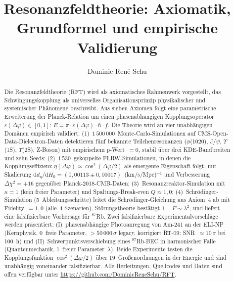 \documentclass[12pt]{iopart}
\begin{document}
	
	\title{Resonanzfeldtheorie: Axiomatik, Grundformel und
		empirische Validierung}
	
	\author{Dominic-Ren\'e Schu}
	\address{Unabh\"angiger Forscher, Deutschland\\
		\href{https://github.com/DominicReneSchu/RFT}%
		{https://github.com/DominicReneSchu/RFT}\\
		ORCID: 0009-0004-9769-9061\\
		Email: dominic.rene.schu@gmail.com}
	
	\begin{abstract}
		Die Resonanzfeldtheorie (RFT) wird als axiomatisches Rahmenwerk
		vorgestellt, das Schwingungskopplung als universelles
		Organisationsprinzip physikalischer und systemischer Ph\"anomene
		beschreibt. Aus sieben Axiomen folgt eine parametrische Erweiterung
		der Planck-Relation um einen phasenabh\"angigen Kopplungsoperator
		$\varepsilon(\Delta\varphi) \in [0,1]$:
		$E = \pi \cdot \varepsilon(\Delta\varphi) \cdot \hbar \cdot f$.
		Die Theorie wird an vier unabh\"angigen Dom\"anen
		empirisch validiert: (1)~$1\,500\,000$~Monte-Carlo-Simulationen
		auf CMS-Open-Data-Dielectron-Daten detektieren f\"unf bekannte
		Teilchenresonanzen ($\phi$(1020), J/$\psi$, $\Upsilon$(1S),
		$\Upsilon$(2S), Z-Boson) mit empirischem p-Wert~$= 0$, stabil
		\"uber drei KDE-Bandbreiten und zehn Seeds;
		(2)~$1\,530$~gekoppelte FLRW-Simulationen, in denen die
		Kopplungseffizienz
		$\eta(\Delta\varphi) \approx \cos^2(\Delta\varphi/2)$ als
		emergente Eigenschaft folgt, mit Skalierung
		$\mathrm{d}d_\eta/\mathrm{d}H_0
		= (0{,}00113 \pm 0{,}00017)$~(km/s/Mpc)$^{-1}$
		und Verbesserung $\Delta\chi^2 = +16$ gegen\"uber
		Planck-2018-CMB-Daten;
		(3)~Resonanzreaktor-Simulation mit $\kappa = 1$ (kein freier
		Parameter) und Spaltungs-Break-even $Q \approx 1{,}0$;
		(4)~Schr\"odinger-Simulation (5~Ableitungsschritte) leitet
		die Schr\"odinger-Gleichung aus Axiom~4 ab mit
		Fidelity~$= 1{,}0$ (alle~4 Szenarien), St\"orungstheorie
		best\"atigt $1-F \sim \lambda^2$, und liefert eine
		falsifizierbare Vorhersage f\"ur ${}^{87}$Rb.
		Zwei falsifizierbare Experimentalvorschl\"age werden
		pr\"asentiert: (I)~phasenabh\"angige Photoanregung von
		Am-241 an der ELI-NP (Kernphysik, 0~freie Parameter,
		$>50\,000\,\sigma$ legacy, korrigiert RT-09: SNR~$\approx 10\,\sigma$ bei 100~h) und (II)~Schwerpunktsverschiebung
		eines ${}^{87}$Rb-BEC in harmonischer Falle
		(Quantenmechanik, 1~freier Parameter~$\lambda$). Beide
		Experimente testen die Kopplungsfunktion
		$\cos^2(\Delta\varphi/2)$ \"uber 19~Gr\"o\ss{}enordnungen
		in der Energie und sind unabh\"angig voneinander falsifizierbar.
		Alle Herleitungen, Quellcodes und Daten sind offen verf\"ugbar
		unter \url{https://github.com/DominicReneSchu/RFT}.
	\end{abstract}
	
\end{document}
